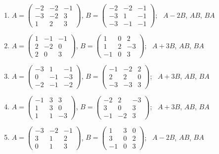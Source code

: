 \begin{enumerate}[label=\arabic*., leftmargin=*]
\item $A=\begin{pmatrix}-2 & -2 & -1\\ -3 & -2 & 3\\ 1 & 2 & 3\end{pmatrix}$, $B=\begin{pmatrix}-2 & -2 & -1\\ -3 & 1 & -1\\ -3 & -1 & -1\end{pmatrix}$; \ $A-2B$, $AB$, $BA$
\item $A=\begin{pmatrix}1 & -1 & -1\\ 2 & -2 & 0\\ 2 & 0 & 3\end{pmatrix}$, $B=\begin{pmatrix}1 & 0 & 2\\ 1 & 2 & -3\\ -1 & 0 & 3\end{pmatrix}$; \ $A+3B$, $AB$, $BA$
\item $A=\begin{pmatrix}-3 & 1 & -1\\ 0 & -1 & -3\\ -2 & -1 & -2\end{pmatrix}$, $B=\begin{pmatrix}-1 & -2 & 2\\ 2 & 2 & 0\\ -3 & -3 & 3\end{pmatrix}$; \ $A+3B$, $AB$, $BA$
\item $A=\begin{pmatrix}-1 & 3 & 3\\ 1 & 3 & 0\\ 1 & 1 & -3\end{pmatrix}$, $B=\begin{pmatrix}-2 & 2 & -3\\ 3 & 0 & 3\\ -1 & -2 & 3\end{pmatrix}$; \ $A+3B$, $AB$, $BA$
\item $A=\begin{pmatrix}-3 & -2 & -1\\ 3 & 1 & 2\\ 0 & 1 & 3\end{pmatrix}$, $B=\begin{pmatrix}1 & 3 & 0\\ 3 & 0 & 2\\ -1 & 0 & 3\end{pmatrix}$; \ $A-2B$, $AB$, $BA$

\end{enumerate}
